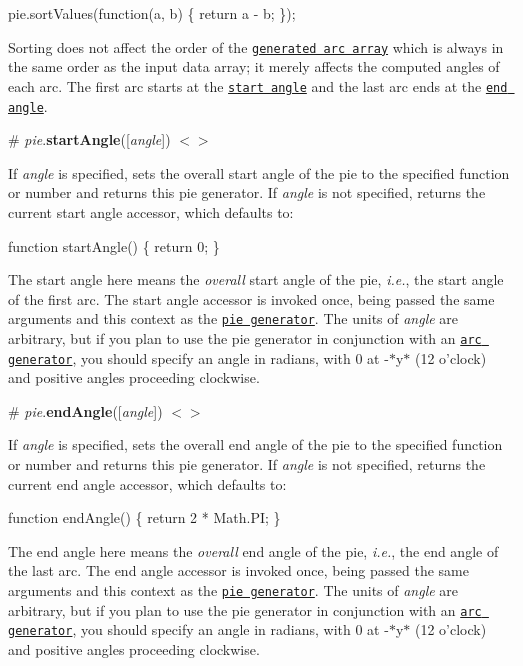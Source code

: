 \begin{DoxyCode}
pie.sortValues(function(a, b) \{ return a - b; \});
\end{DoxyCode}


Sorting does not affect the order of the \href{#_pie}{\tt generated arc array} which is always in the same order as the input data array; it merely affects the computed angles of each arc. The first arc starts at the \href{#pie_startAngle}{\tt start angle} and the last arc ends at the \href{#pie_endAngle}{\tt end angle}.

\label{_pie_startAngle}%
\# {\itshape pie}.{\bfseries start\+Angle}(\mbox{[}{\itshape angle}\mbox{]}) \href{https://github.com/d3/d3-shape/blob/master/src/pie.js#L66}{\tt $<$$>$}

If {\itshape angle} is specified, sets the overall start angle of the pie to the specified function or number and returns this pie generator. If {\itshape angle} is not specified, returns the current start angle accessor, which defaults to\+:


\begin{DoxyCode}
function startAngle() \{
  return 0;
\}
\end{DoxyCode}


The start angle here means the {\itshape overall} start angle of the pie, {\itshape i.\+e.}, the start angle of the first arc. The start angle accessor is invoked once, being passed the same arguments and {\ttfamily this} context as the \href{#_pie}{\tt pie generator}. The units of {\itshape angle} are arbitrary, but if you plan to use the pie generator in conjunction with an \href{#arcs}{\tt arc generator}, you should specify an angle in radians, with 0 at -\/$\ast$y$\ast$ (12 o’clock) and positive angles proceeding clockwise.

\label{_pie_endAngle}%
\# {\itshape pie}.{\bfseries end\+Angle}(\mbox{[}{\itshape angle}\mbox{]}) \href{https://github.com/d3/d3-shape/blob/master/src/pie.js#L70}{\tt $<$$>$}

If {\itshape angle} is specified, sets the overall end angle of the pie to the specified function or number and returns this pie generator. If {\itshape angle} is not specified, returns the current end angle accessor, which defaults to\+:


\begin{DoxyCode}
function endAngle() \{
  return 2 * Math.PI;
\}
\end{DoxyCode}


The end angle here means the {\itshape overall} end angle of the pie, {\itshape i.\+e.}, the end angle of the last arc. The end angle accessor is invoked once, being passed the same arguments and {\ttfamily this} context as the \href{#_pie}{\tt pie generator}. The units of {\itshape angle} are arbitrary, but if you plan to use the pie generator in conjunction with an \href{#arcs}{\tt arc generator}, you should specify an angle in radians, with 0 at -\/$\ast$y$\ast$ (12 o’clock) and positive angles proceeding clockwise.


